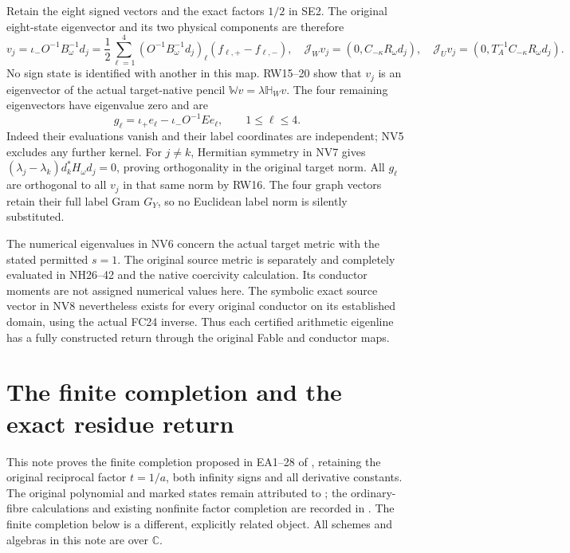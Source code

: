 \documentclass[11pt]{article}
\newcommand{\C}{\mathbb C}
\begin{document}
Retain the eight signed vectors and the exact factors $1/2$
in SE2. The original eight-state eigenvector and its two
physical components are therefore
\[
 v_j=\iota_-O^{-1}B_\omega^{-1}d_j
   =\frac12\sum_{\ell=1}^4
     (O^{-1}B_\omega^{-1}d_j)_\ell(f_{\ell,+}-f_{\ell,-}),
 \quad
 \mathcal J_Wv_j=(0,C_{-\kappa}R_\omega d_j),\quad
 \mathcal J_Uv_j=(0,T_A^{-1}C_{-\kappa}R_\omega d_j).
 \tag{NV8}
\]
No sign state is identified with another in this map.
RW15--20 show that $v_j$ is an eigenvector of the
actual target-native pencil
$\mathbb Wv=\lambda\mathbb H_Wv$.
The four remaining eigenvectors have eigenvalue zero and are
\[
 g_\ell=\iota_+e_\ell-\iota_-O^{-1}Ee_\ell,\qquad
 1\le\ell\le4.
 \tag{NV9}
\]
Indeed their evaluations vanish and their label coordinates
are independent; NV5 excludes any further kernel.
For $j\ne k$, Hermitian symmetry in NV7 gives
$(\lambda_j-\lambda_k)d_k^*H_\omega d_j=0$, proving
orthogonality in the original target norm. All $g_\ell$
are orthogonal to all $v_j$ in that same norm by RW16.
The four graph vectors retain their full label Gram $G_Y$,
so no Euclidean label norm is silently substituted.

The numerical eigenvalues in NV6 concern the actual target
metric with the stated permitted $s=1$. The original
source metric is separately and completely evaluated in
NH26--42 and the native coercivity calculation. Its
conductor moments are not assigned numerical values here.
The symbolic exact source vector in NV8 nevertheless exists
for every original conductor on its established domain,
using the actual FC24 inverse. Thus each certified
arithmetic eigenline has a fully constructed return
through the original Fable and conductor maps.


\section{The finite completion and the exact residue return}
This note proves the finite completion proposed in EA1--28 of
\cite{ExceptionalAtlas}, retaining the original reciprocal factor
$t=1/a$, both infinity signs and all derivative constants.
The original polynomial and marked states remain attributed
to \cite{ES488}; the ordinary-fibre calculations and existing
nonfinite factor completion are recorded in \cite{Fable029}.
The finite completion below is a different, explicitly related
object. All schemes and algebras in this note are over $\C$.
\end{document}
